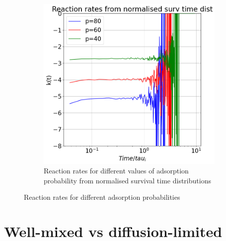 \documentclass{article}
\begin{document}
\begin{figure}[htbp]
\begin{subfigure}[b]{0.45\textwidth}
        \includegraphics[width=\textwidth]{images/compareProbNormAdsRates.png}
        \caption{Reaction rates for different values of adsorption probability from normalised survival time distributions}
    \end{subfigure}
    \caption{Reaction rates for different adsorption probabilities}
    \label{fig:reactionRatesAdsProb}
\end{figure}

\FloatBarrier  %
\section{Well-mixed vs diffusion-limited}
\end{document}
